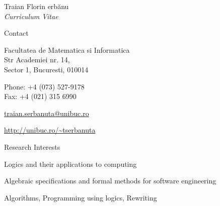 \documentclass[10pt]{article}
\newcommand{\Sh}{\unichar{0536}}
\newcommand{\tz}{\unichar{0539}}
\newcommand{\Serbanuta}{{\Sh}er\-b{\u a}\-nu\-{\tz}{\u a}}
\begin{document}


\newlength{\oldcvlabelwidth}
\setlength{\oldcvlabelwidth}{\cvlabelwidth}

\renewcommand*{\cvbibname}{}

\begin{cv}{Traian Florin \Serbanuta{}\\{\large \itshape Curriculum Vitae}}

\begin{cvlist}{Contact}
    \item
	Facultatea de Matematica si Informatica\\
    Str Academiei nr. 14,\\
	Sector 1, Bucuresti, 010014
    \item Phone: +4 (073) 527-9178
    \\ Fax: +4 (021) 315 6990
    \item \href{mailto:traian.serbanuta@unibuc.ro}{traian.serbanuta@unibuc.ro}
    \item \href{http://unibuc.ro/~tserbanuta}
    {\url{http://unibuc.ro/~tserbanuta}}
\end{cvlist}

 {
\setlength{\cvlabelwidth}{1em}
\begin{cvlist}{Research Interests}
\item Logics and their applications to computing
\item Algebraic specifications and formal methods for software engineering
\item Algorithms, Programming using logics, Rewriting
\end{cvlist}
\setlength{\cvlabelwidth}{\oldcvlabelwidth}
} { 
}


\end{cv}
\end{document}
